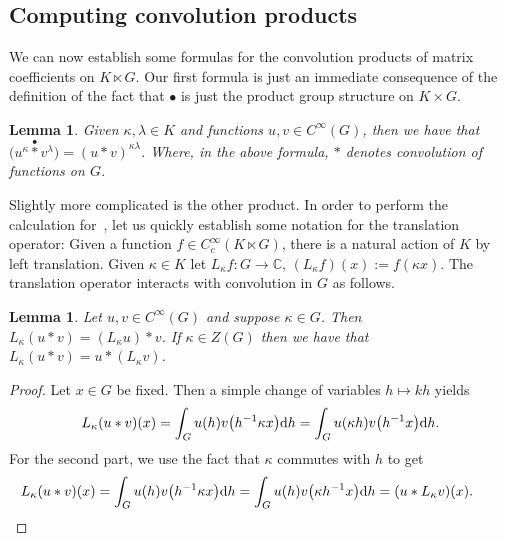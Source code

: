 \documentclass[10pt,a4paper]{amsart}
\numberwithin{equation}{section}
\newtheorem{Lemma}[Theorem]{Lemma}
\theoremstyle{definition}
\newcommand{\BBC}{\mathbb{C}}
\newcommand{\stardot}{\overset{{\bullet}}{*}}
\newcommand{\starcirc}{\overset{\circ}{*}}
\newcommand{\inv}{^{-1}}
\begin{document}
\subsection{Computing convolution products}
We can now establish some formulas for the convolution products of matrix coefficients on $K\ltimes G$. Our first formula is just an immediate consequence of the definition of the fact that $ \bullet $ is just the product group structure on $ K \times G $.
\begin{Lemma}
  Given $ \kappa, \lambda \in K $ and functions $ u, v \in C^\infty(G) $, then we have that
  $ \big(u^\kappa \stardot v^\lambda \big) = (u * v )^{\kappa \lambda}$.
  Where, in the above formula, $ * $ denotes convolution of functions on $ G $.
\end{Lemma}
Slightly more complicated is the other product. In order to perform the calculation for~\smash{$ \starcirc $}, let us quickly establish some notation for the translation operator: Given a function ${f \in C_c^\infty(K \ltimes G)}$, there is a natural action of $ K $ by left translation. Given $ \kappa \in K $ let
$L_\kappa f \colon G \to \BBC$, $(L_\kappa f) (x) := f(\kappa x)$.
The translation operator interacts with convolution in $ G $ as follows.

\begin{Lemma}\label{lemma:translation.and.convolution}
  Let $ u, v \in C^\infty(G) $ and suppose $ \kappa \in G $. Then
  $L_{\kappa} (u * v) = (L_\kappa u) * v$.
  If $ \kappa \in Z(G) $ then we have that
  $ L_\kappa( u * v) = u * (L_{\kappa} v)$.
\end{Lemma}
\begin{proof}
  Let $x\in G$ be fixed. Then a simple change of variables $ h \mapsto k h $ yields
    \begin{align*}L_\kappa(u * v)(x) =  \int_G u(h)v\big(h^{-1}\kappa x\big){\rm d}h
    = \int_G u(\kappa h) v\big(h\inv x\big) {\rm d}h.
    \end{align*}
    For the second part, we use the fact that $ \kappa $ commutes with $ h $ to get
  \begin{align*}
  L_\kappa(u * v)(x) =  \int_G u(h)v\big(h^{-1}\kappa x\big){\rm d}h
    = \int_G u(h)v\big(\kappa h^{-1}x\big){\rm d}h=(u * L_\kappa v)(x).\tag*{\qed}
    \end{align*}\renewcommand{\qed}{}
\end{proof}
\end{document}
